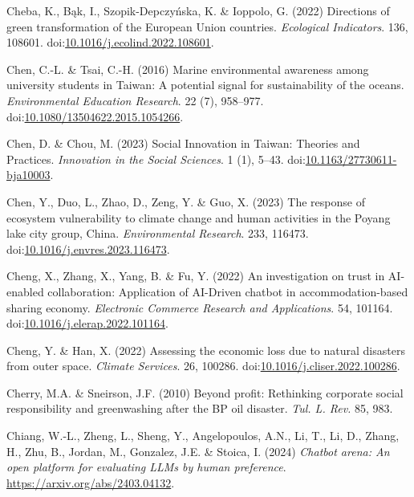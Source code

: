 \documentclass[
  letterpaper,
  DIV=11,
  numbers=noendperiod]{scrartcl}
\newlength{\cslhangindent}
\newenvironment{CSLReferences}[2] %
 {\begin{list}{}{%
  \setlength{\itemindent}{0pt}
  \setlength{\leftmargin}{0pt}
  \setlength{\parsep}{0pt}
  \ifodd #1
   \setlength{\leftmargin}{\cslhangindent}
   \setlength{\itemindent}{-1\cslhangindent}
  \fi
  \setlength{\itemsep}{#2\baselineskip}}}
 {\end{list}}
\begin{document}
\begin{CSLReferences}{0}{1}
Cheba, K., Bąk, I., Szopik-Depczyńska, K. \& Ioppolo, G. (2022)
Directions of green transformation of the {European Union} countries.
\emph{Ecological Indicators}. 136, 108601.
doi:\href{https://doi.org/10.1016/j.ecolind.2022.108601}{10.1016/j.ecolind.2022.108601}.

Chen, C.-L. \& Tsai, C.-H. (2016) Marine environmental awareness among
university students in {Taiwan}: A potential signal for sustainability
of the oceans. \emph{Environmental Education Research}. 22 (7),
958--977.
doi:\href{https://doi.org/10.1080/13504622.2015.1054266}{10.1080/13504622.2015.1054266}.

Chen, D. \& Chou, M. (2023) Social {Innovation} in {Taiwan}: {Theories}
and {Practices}. \emph{Innovation in the Social Sciences}. 1 (1), 5--43.
doi:\href{https://doi.org/10.1163/27730611-bja10003}{10.1163/27730611-bja10003}.

Chen, Y., Duo, L., Zhao, D., Zeng, Y. \& Guo, X. (2023) The response of
ecosystem vulnerability to climate change and human activities in the
{Poyang} lake city group, {China}. \emph{Environmental Research}. 233,
116473.
doi:\href{https://doi.org/10.1016/j.envres.2023.116473}{10.1016/j.envres.2023.116473}.

Cheng, X., Zhang, X., Yang, B. \& Fu, Y. (2022) An investigation on
trust in {AI-enabled} collaboration: {Application} of {AI-Driven}
chatbot in accommodation-based sharing economy. \emph{Electronic
Commerce Research and Applications}. 54, 101164.
doi:\href{https://doi.org/10.1016/j.elerap.2022.101164}{10.1016/j.elerap.2022.101164}.

Cheng, Y. \& Han, X. (2022) Assessing the economic loss due to natural
disasters from outer space. \emph{Climate Services}. 26, 100286.
doi:\href{https://doi.org/10.1016/j.cliser.2022.100286}{10.1016/j.cliser.2022.100286}.

Cherry, M.A. \& Sneirson, J.F. (2010) Beyond profit: {Rethinking}
corporate social responsibility and greenwashing after the {BP} oil
disaster. \emph{Tul. L. Rev.} 85, 983.

Chiang, W.-L., Zheng, L., Sheng, Y., Angelopoulos, A.N., Li, T., Li, D.,
Zhang, H., Zhu, B., Jordan, M., Gonzalez, J.E. \& Stoica, I. (2024)
\emph{Chatbot arena: {An} open platform for evaluating {LLMs} by human
preference}. \url{https://arxiv.org/abs/2403.04132}.


\end{CSLReferences}
\end{document}
